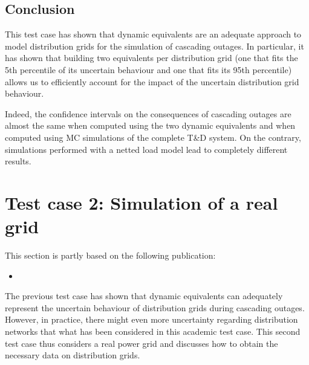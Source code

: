 \subsection{Conclusion}


This test case has shown that dynamic equivalents are an adequate approach to model distribution grids for the simulation of cascading outages. In particular, it has shown that building two equivalents per distribution grid (one that fits the 5th percentile of its uncertain behaviour and one that fits its 95th percentile) allows us to efficiently account for the impact of the uncertain distribution grid behaviour.

Indeed, the confidence intervals on the consequences of cascading outages are almost the same when computed using the two dynamic equivalents and when computed using MC simulations of the complete T\&D system. On the contrary, simulations performed with a netted load model lead to completely different results.



\section{Test case 2: Simulation of a real grid}
\label{sec:distrib_CIGRE}

\begin{tcolorbox}[width=\linewidth, sharp corners=all,
    colback=white!80!black,
    colframe=white!80!black]
This section is partly based on the following publication:
\begin{itemize}
    \item {}
\end{itemize}
\end{tcolorbox}

The previous test case has shown that dynamic equivalents can adequately represent the uncertain behaviour of distribution grids during cascading outages. However, in practice, there might even more uncertainty regarding distribution networks that what has been considered in this academic test case. This second test case thus considers a real power grid and discusses how to obtain the necessary data on distribution grids.

